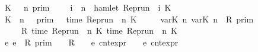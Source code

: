 \begin{isabellebody}
{\isacharbar}\ {\isacartoucheopen}{\isasymlbrakk}\ K\ {\isasymnot}{\isasymUp}\ {\isasymge}\ n\ {\isasymrbrakk}\isactrlsub p\isactrlsub r\isactrlsub i\isactrlsub m\ \ \ {\isacharequal}\ {\isacharbraceleft}{\isasymrho}{\isachardot}\ {\isasymforall}i\ {\isasymge}\ n{\isachardot}\ {\isasymnot}\ hamlet\ {\isacharparenleft}{\isacharparenleft}Rep{\isacharunderscore}run\ {\isasymrho}{\isacharparenright}\ i\ K{\isacharparenright}\ {\isacharbraceright}{\isacartoucheclose}\isanewline
{\isacharbar}\ {\isacartoucheopen}{\isasymlbrakk}\ K\ {\isasymDown}\ n\ {\isacharat}\ {\isasymtau}\ {\isasymrbrakk}\isactrlsub p\isactrlsub r\isactrlsub i\isactrlsub m\ {\isacharequal}\ {\isacharbraceleft}{\isasymrho}{\isachardot}\ time\ {\isacharparenleft}{\isacharparenleft}Rep{\isacharunderscore}run\ {\isasymrho}{\isacharparenright}\ n\ K{\isacharparenright}\ {\isacharequal}\ {\isasymtau}\ {\isacharbraceright}{\isacartoucheclose}\isanewline
{\isacharbar}\ {\isacartoucheopen}{\isasymlbrakk}\ {\isasymlfloor}{\isasymtau}\isactrlsub v\isactrlsub a\isactrlsub r{\isacharparenleft}K\ n\ {\isasymtau}\isactrlsub v\isactrlsub a\isactrlsub r{\isacharparenleft}K\ n\ {\isasymin}\ R\ {\isasymrbrakk}\isactrlsub p\isactrlsub r\isactrlsub i\isactrlsub m\ {\isacharequal}\isanewline
\ \ \ \ {\isacharbraceleft}\ {\isasymrho}{\isachardot}\ R\ {\isacharparenleft}time\ {\isacharparenleft}{\isacharparenleft}Rep{\isacharunderscore}run\ {\isasymrho}{\isacharparenright}\ n\ K\ time\ {\isacharparenleft}{\isacharparenleft}Rep{\isacharunderscore}run\ {\isasymrho}{\isacharparenright}\ n\ K\ {\isacharbraceright}{\isacartoucheclose}\isanewline
{\isacharbar}\ {\isacartoucheopen}{\isasymlbrakk}\ {\isasymlceil}e\ e\ {\isasymin}\ R\ {\isasymrbrakk}\isactrlsub p\isactrlsub r\isactrlsub i\isactrlsub m\ {\isacharequal}\ {\isacharbraceleft}\ {\isasymrho}{\isachardot}\ R\ {\isacharparenleft}{\isasymlbrakk}\ {\isasymrho}\ {\isasymturnstile}\ e\ {\isasymrbrakk}\isactrlsub c\isactrlsub n\isactrlsub t\isactrlsub e\isactrlsub x\isactrlsub p\isactrlsub r{\isacharcomma}\ {\isasymlbrakk}\ {\isasymrho}\ {\isasymturnstile}\ e\ {\isasymrbrakk}\isactrlsub c\isactrlsub n\isactrlsub t\isactrlsub e\isactrlsub x\isactrlsub p\isactrlsub r{\isacharparenright}\ {\isacharbraceright}{\isacartoucheclose}\isanewline

\end{isabellebody}
